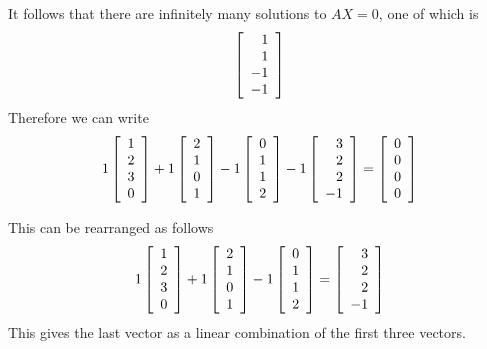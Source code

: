 \begin{solution}
It follows that there are infinitely many solutions to $AX=0$, one of which is
\begin{equation*}
\left[ 
\begin{array}{r}
1 \\ 
1 \\ 
-1 \\ 
-1
\end{array}
\right]
\end{equation*}
Therefore we can write 
\begin{equation*}
1\left[ 
\begin{array}{r}
1 \\ 
2 \\ 
3 \\ 
0
\end{array}
\right] +1\left[
\begin{array}{r}
2 \\ 
1 \\ 
0 \\ 
1
\end{array}
\right]  -1 \left[ 
\begin{array}{r}
0 \\ 
1 \\ 
1 \\ 
2
\end{array}
\right] -1 \left[ 
\begin{array}{r}
3 \\ 
2 \\ 
2 \\ 
-1
\end{array}
\right] =
\left[ 
\begin{array}{r}
0 \\ 
0 \\ 
0 \\ 
0
\end{array}
\right]
\end{equation*}

This can be rearranged as follows
\begin{equation*}
1\left[ 
\begin{array}{r}
1 \\ 
2 \\ 
3 \\ 
0
\end{array}
\right] +1\left[
\begin{array}{r}
2 \\ 
1 \\ 
0 \\ 
1
\end{array}
\right]  -1 \left[ 
\begin{array}{r}
0 \\ 
1 \\ 
1 \\ 
2
\end{array}
\right] =\left[ 
\begin{array}{r}
3 \\ 
2 \\ 
2 \\ 
-1
\end{array}
\right] 
\end{equation*}
This gives the last vector as a linear combination of the first three vectors.


\end{solution}
